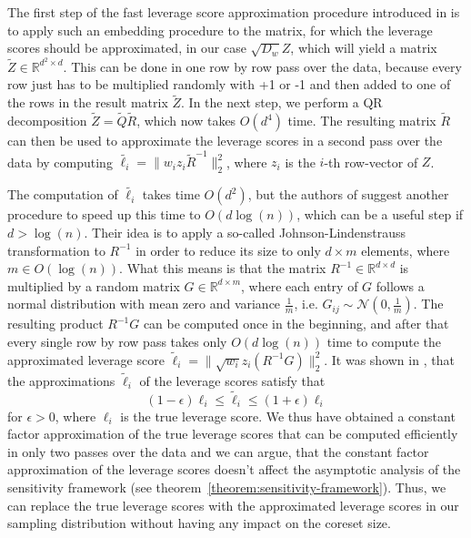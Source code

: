 The first step of the fast leverage score approximation procedure
introduced in \cite{leverage-scores-drineas} is to apply such
an embedding procedure to the matrix, for which the leverage scores
should be approximated, in our case $\sqrt{D_w}Z$, which will
yield a matrix $\tilde{Z} \in \mathbb{R}^{d^2 \times d}$.
This can be done in one row by row pass over the data, because
every row just has to be multiplied randomly with +1 or -1 and
then added to one of the rows in the result matrix $\tilde{Z}$.
In the next step, we perform a QR decomposition
$\tilde{Z} = \tilde{Q} \tilde{R}$, which now takes
$O(d^4)$ time. The resulting
matrix $\tilde{R}$ can then be used to approximate
the leverage scores in a second pass over the data by computing
$\tilde{\ell_i} = \lVert w_i z_i \tilde{R}^{-1} \rVert_2^2$, where $z_i$
is the $i$-th row-vector of $Z$.

The computation of $\tilde{\ell_i}$ takes time $O(d^2)$, but
the authors of \cite{leverage-scores-drineas} suggest another
procedure to speed up this time to $O(d \log(n))$, which can be
a useful step if $d > \log(n)$.
Their idea is to apply a so-called Johnson-Lindenstrauss
transformation \cite{johnson-lindenstrauss} to $R^{-1}$
in order to reduce its size to only $d \times m$ elements,
where $m \in O(\log(n))$. What this means is that the matrix
$R^{-1} \in \mathbb{R}^{d \times d}$ is multiplied by a random matrix
$G \in \mathbb{R}^{d \times m}$, where each entry of $G$
follows a normal distribution with mean zero and variance
$\frac{1}{m}$, i.e. $G_{ij} \sim \mathcal{N}(0, \frac{1}{m})$.
The resulting product $R^{-1}G$ can be computed once in the beginning,
and after that every single row by row pass takes only
$O(d \log(n))$ time to compute the approximated leverage
score $\tilde{\ell}_i = \lVert \sqrt{w_i} z_i (R^{-1} G) \rVert_2^2$.
It was shown in \cite{leverage-scores-drineas}, that the
approximations $\tilde{\ell}_i$ of the leverage scores satisfy that
\begin{equation*}
    (1 - \epsilon) \ell_i \leq \tilde{\ell}_i \leq (1 + \epsilon) \ell_i
\end{equation*}
for $\epsilon > 0$, where $\ell_i$ is the true leverage score.
We thus have obtained a constant factor
approximation of the true leverage scores that can be computed
efficiently in only two passes over the data and we can argue,
that the constant factor approximation of the leverage scores
doesn't affect the asymptotic analysis of the sensitivity
framework (see theorem~\ref{theorem:sensitivity-framework}).
Thus, we can replace the true leverage scores with the approximated
leverage scores in our sampling distribution without having any
impact on the coreset size.

